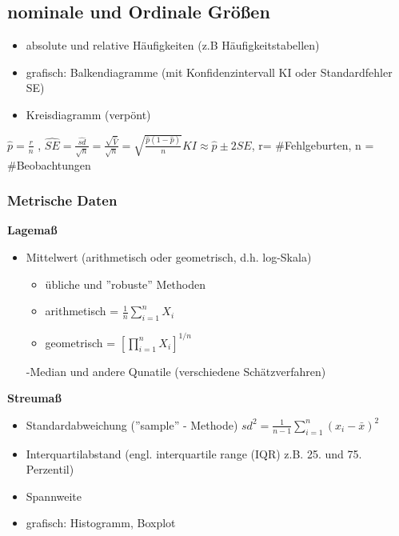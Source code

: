 \documentclass[10pt,a4paper]{article}
\theoremstyle{definition}
\begin{document}
\subsection{nominale und Ordinale Größen}

\begin{itemize}
	\item absolute und relative Häufigkeiten (z.B Häufigkeitstabellen)
	\item grafisch: Balkendiagramme (mit Konfidenzintervall KI oder Standardfehler SE)
	\item Kreisdiagramm (verpönt)
\end{itemize}

	
	$\hat{p} = \frac{r}{n}$ , $\hat{SE} = \frac{\hat{sd}}{\sqrt{n}}= \frac{\sqrt{\hat{V}}}{\sqrt{n}} = \sqrt{\frac{\hat{p} (1- \hat{p})}{n}}
KI \approx \hat{p} \pm 2 SE$, r= \#Fehlgeburten, n = \#Beobachtungen 


\subsubsection*{Metrische Daten}
\textbf{Lagemaß}
\begin{itemize}
	\item Mittelwert (arithmetisch oder geometrisch, d.h. log-Skala)
	\begin{itemize}
		\item übliche und ''robuste'' Methoden
		\item arithmetisch  = $\frac{1}{n}\sum_{i=1}^{n} X_i$
		\item geometrisch  = $[ \prod_{i=1}^{n} X_i]^{1/n}$
	\end{itemize}
-Median und andere Qunatile (verschiedene Schätzverfahren)
\end{itemize}
\textbf{Streumaß}
\begin{itemize}
	\item Standardabweichung (''sample'' - Methode) $sd^2 = \frac{1}{n-1} \sum_{i=1}^{n}(x_i - \bar{x})^2$
	\item Interquartilabstand (engl. interquartile range (IQR) z.B. 25. und 75. Perzentil)
	\item Spannweite
	\item grafisch: Histogramm, Boxplot	
\end{itemize}
\end{document}
